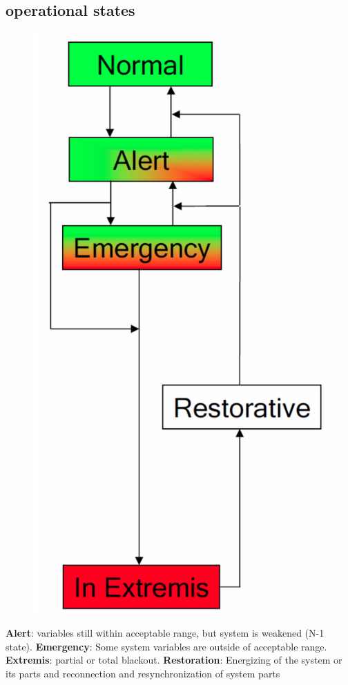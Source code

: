 \documentclass[a4paper,10pt,landscape]{scrartcl}
\begin{document}
\begin{multicols*}{3}
\vspace{4cm}

\section{operational states}



\begin{figure}
    \centering
    \includegraphics[width=\linewidth]{src/operation_sketch.png}
\end{figure}
\textbf{Alert}: variables still within acceptable range, but system is weakened (N-1 state).
\textbf{Emergency}: Some system variables are outside of
acceptable range.
\textbf{Extremis}: partial or total blackout. 
\textbf{Restoration}: Energizing of the system or its parts
and reconnection and resynchronization of system
parts


\end{multicols*}
\end{document}

